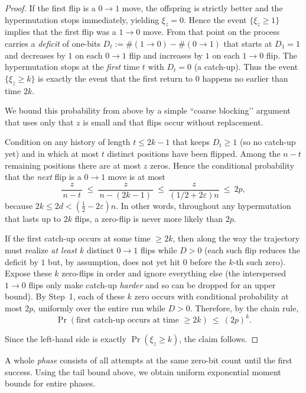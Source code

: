\begin{proof}
	If the first flip is a $0\!\to 1$ move, the offspring is strictly better and the hypermutation stops immediately, yielding $\xi_z=0$. Hence the event $\{\xi_z\ge 1\}$ implies that the first flip was a $1\!\to 0$ move. From that point on the process carries a \emph{deficit} of one-bits $D_t:=\#(1\!\to 0)-\#(0\!\to 1)$ that starts at $D_1=1$ and decreases by $1$ on each $0\!\to 1$ flip and increases by $1$ on each $1\!\to 0$ flip. The hypermutation stops at the \emph{first} time $t$ with $D_t=0$ (a catch-up). Thus the event $\{\xi_z\ge k\}$ is exactly the event that the first return to $0$ happens no earlier than time $2k$.
	
	We bound this probability from above by a simple ``coarse blocking’’ argument that uses only that $z$ is small and that flips occur without replacement.
	
	\smallskip
	Condition on any history of length $t\le 2k-1$ that keeps $D_t\ge 1$ (so no catch-up yet) and in which at most $t$ distinct positions have been flipped. Among the $n-t$ remaining positions there are at most $z$ zeros. Hence the conditional probability that the \emph{next} flip is a $0\!\to 1$ move is at most
	\[
	\frac{z}{\,n-t\,}\ \le\ \frac{z}{\,n-(2k-1)\,}\ \le\ \frac{z}{(1/2+2\varepsilon)n}\ \le\ 2p,
	\]
	because $2k\le 2d<(\tfrac12-2\varepsilon)n$. In other words, throughout any hypermutation that lasts up to $2k$ flips, a zero-flip is never more likely than $2p$.
	
	\smallskip
	If the first catch-up occurs at some time $\ge 2k$, then along the way the trajectory must realize \emph{at least $k$} distinct $0\!\to 1$ flips while $D>0$ (each such flip reduces the deficit by $1$ but, by assumption, does not yet hit $0$ before the $k$-th such zero). Expose these $k$ zero-flips in order and ignore everything else (the interspersed $1\!\to 0$ flips only make catch-up \emph{harder} and so can be dropped for an upper bound). By Step~1, each of these $k$ zero occurs with conditional probability at most $2p$, uniformly over the entire run while $D>0$. Therefore, by the chain rule,
	\[
	\Pr(\text{first catch-up occurs at time }\ge 2k)\ \le\ (2p)^k.
	\]
	
	
	Since the left-hand side is exactly $\Pr(\xi_z\ge k)$, the claim follows.
\end{proof}


A whole \emph{phase} consists of all attempts at the same zero-bit count until the 
first success.  
Using the tail bound above, we obtain uniform exponential moment bounds for 
entire phases.

